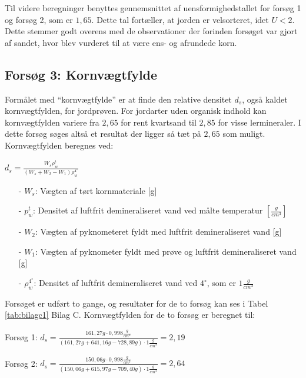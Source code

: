 Til videre beregninger benyttes gennemsnittet af uensformighedstallet for forsøg 1 og forsøg 2, som er $1,\!65$. Dette tal fortæller, at jorden er velsorteret, idet $U<2$. Dette stemmer godt overens med de observationer der forinden forsøget var gjort af sandet, hvor blev vurderet til at være ens- og afrundede korn. 

\subsection{Forsøg 3: Kornvægtfylde}
Formålet med “kornvægtfylde” er at finde den relative densitet $d_s$, også kaldet kornvægtfylden, for jordprøven. For jordarter uden organisk indhold kan kornvægtfylden variere fra $2,\!65$ for rent kvartsand til $2,\!85$ for visse lermineraler. I dette forsøg søges altså et resultat der ligger så tæt på $2,\!65$ som muligt.
\newline
\newline
Kornvægtfylden beregnes ved:

\begin{center}
	$d_s = \frac{W_s \rho_w^t}{(W_s + W_2 - W_1)\rho_w^{4^{\circ}}}$
\end{center}

\begin{itemize}
	\item[-] $W_s$: Vægten af tørt kornmateriale [g]
	\item[-] $p_w^t$: Densitet af luftfrit demineraliseret vand ved målte temperatur $[\frac{g}{cm^3}]$
	\item[-] $W_2$: Vægten af pyknometeret fyldt med luftfrit demineraliseret vand [g]
	\item[-] $W_1$: Vægten af pyknometer fyldt med prøve og luftfrit demineraliseret vand [g]
	\item[-] $\rho_w^{4^{\circ}}$: Densitet af luftfrit demineraliseret vand ved $4^{\circ}$, som er $1 \frac{g}{cm^3}$
\end{itemize}

Forsøget er udført to gange, og resultater for de to forsøg kan ses i Tabel \ref{tab:bilagc1} Bilag C. Kornvægtfylden for de to forsøg er beregnet til:

\begin{center}
	Forsøg 1: $d_{s} = \frac{161,\!27 g \cdot 0,\!998 \frac{g}{cm^3}}{(161,\!27 g + 641,\!16 g - 728,\!89 g)\cdot 1 \frac{g}{cm^3}} = 2,\!19$
\end{center}
\begin{center}
	Forsøg 2: $d_{s} = \frac{150,\!06 g \cdot 0,\!998 \frac{g}{cm^3}}{(150,\!06 g + 615,\!97 g - 709,\!40 g)\cdot 1 \frac{g}{cm^3}} = 2,\!64$
\end{center} 

